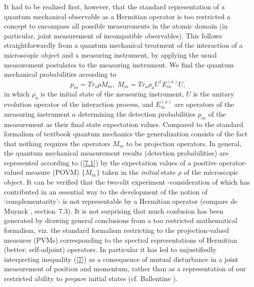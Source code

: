 \documentclass[12pt]{article}
\begin{document}
It had to be realized first,
however, that the standard representation of a quantum mechanical
observable as a Hermitian operator is too restricted a concept to
encompass all possible measurements in the atomic domain (in
particular, joint measurement of incompatible observables). This
follows straightforwardly from a quantum mechanical treatment of
the interaction of a microscopic object and a measuring
instrument, by applying the usual measurement postulates to the
measuring instrument. We find the quantum mechanical probabilities
according to
\begin{equation}\label{7.1}
    p_m=Tr_o \rho M_m,\; M_m=Tr_a \rho_a U^\dagger E_m^{(a)}U,
\end{equation}
in which $\rho_a$ is the initial state of the measuring
instrument, $U$ is the unitary evolution operator of the
interaction process, and $E_m^{(a)}$ are operators of the
measuring instrument $a$ determining the detection probabilities
$p_m$ of the measurement as their final state expectation values.
Compared to the standard formalism of textbook quantum mechanics
the generalization consists of the fact that nothing requires the
operators $M_m$ to be projection operators. In general, the
quantum mechanical measurement results (detection probabilities)
are represented according to (\ref{7.1}) by the expectation values
of a positive operator-valued measure (POVM) $\{M_m\}$ taken in
the {\em initial} state $\rho$ of the microscopic object. It can
be verified that the two-slit experiment -consideration of which
has contributed in an essential way to the development of the
notion of `complementarity'- is not representable by a Hermitian
operator (compare de Muynck \cite{dM2002}, section~7.3). It is not
surprising that much confusion has been generated by drawing
general conclusions from a too restricted mathematical formalism,
viz. the standard formalism restricting to the projection-valued
measures (PVMs) corresponding to the spectral representations of
Hermitian (better: self-adjoint) operators. In particular it has
led to unjustifiedly interpreting inequality (\ref{7}) as a
consequence of mutual disturbance in a joint measurement of
position and momentum, rather than as a representation of our
restricted ability to {\em prepare} initial states (cf. Ballentine
\cite{Bal70}).
\end{document}
